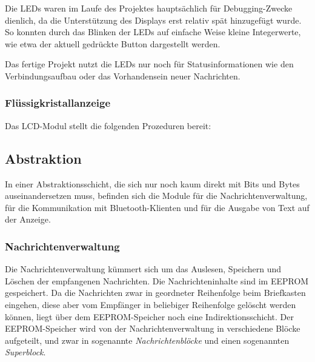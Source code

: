 \documentclass[ngerman]{article}
\begin{document}
Die LEDs waren im Laufe des Projektes hauptsächlich für Debugging-Zwecke
dienlich, da die Unterstützung des Displays erst relativ spät hinzugefügt
wurde. So konnten durch das Blinken der LEDs auf einfache Weise kleine
Integerwerte, wie etwa der aktuell gedrückte Button dargestellt werden.

Das fertige Projekt nutzt die LEDs nur noch für Statusinformationen
wie den Verbindungsaufbau oder das Vorhandensein neuer Nachrichten.

\subsubsection{Flüssigkristallanzeige}

Das LCD-Modul stellt die folgenden Prozeduren bereit:




\subsection{Abstraktion}

In einer Abstraktionsschicht, die sich nur noch kaum direkt mit Bits und Bytes
auseinandersetzen muss, befinden sich die Module für die Nachrichtenverwaltung,
für die Kommunikation mit Bluetooth-Klienten und für die Ausgabe von Text auf
der Anzeige.


\subsubsection{Nachrichtenverwaltung}

Die Nachrichtenverwaltung kümmert sich um das Auslesen, Speichern und
Löschen der empfangenen Nachrichten. Die Nachrichteninhalte sind im EEPROM
gespeichert.  Da die Nachrichten zwar in geordneter Reihenfolge beim
Briefkasten eingehen, diese aber vom Empfänger in beliebiger Reihenfolge
gelöscht werden können, liegt über dem EEPROM-Speicher noch eine
In\-di\-rek\-tions\-schicht. Der EEPROM-Speicher wird von der
Nachrichtenverwaltung in verschiedene Blöcke aufgeteilt, und zwar in
sogenannte \textit{Nachrichtenblöcke} und einen sogenannten
\textit{Superblock}.

\end{document}
